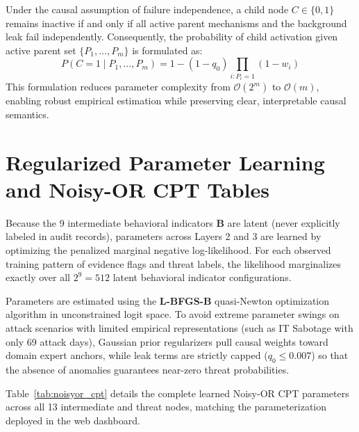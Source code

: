 \documentclass[12pt,a4paper]{report}
\begin{document}
Under the causal assumption of failure independence, a child node $C \in \{0, 1\}$ remains inactive if and only if all active parent mechanisms and the background leak fail independently. Consequently, the probability of child activation given active parent set $\{P_1, \dots, P_m\}$ is formulated as:
\begin{equation}
P\left(C = 1 \mid P_1, \dots, P_m\right) = 1 - (1 - q_0) \prod_{i: P_i = 1} (1 - w_i)
\label{eq:noisy_or}
\end{equation}
This formulation reduces parameter complexity from $\mathcal{O}(2^m)$ to $\mathcal{O}(m)$, enabling robust empirical estimation while preserving clear, interpretable causal semantics.

\section{Regularized Parameter Learning and Noisy-OR CPT Tables}
Because the 9 intermediate behavioral indicators $\mathbf{B}$ are latent (never explicitly labeled in audit records), parameters across Layers 2 and 3 are learned by optimizing the penalized marginal negative log-likelihood. For each observed training pattern of evidence flags and threat labels, the likelihood marginalizes exactly over all $2^9 = 512$ latent behavioral indicator configurations.

Parameters are estimated using the \textbf{L-BFGS-B} quasi-Newton optimization algorithm in unconstrained logit space. To avoid extreme parameter swings on attack scenarios with limited empirical representations (such as IT Sabotage with only 69 attack days), Gaussian prior regularizers pull causal weights toward domain expert anchors, while leak terms are strictly capped ($q_0 \le 0.007$) so that the absence of anomalies guarantees near-zero threat probabilities.

Table~\ref{tab:noisyor_cpt} details the complete learned Noisy-OR CPT parameters across all 13 intermediate and threat nodes, matching the parameterization deployed in the web dashboard.
\end{document}
